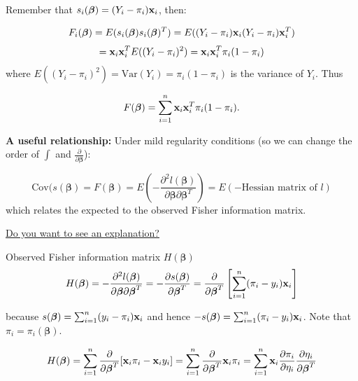 \documentclass[
  ignorenonframetext,
]{beamer}
\begin{document}
\begin{frame}
Remember that \(s_i(\boldsymbol{\beta})=(Y_i-\pi_i){\bf x}_i\), then:

\[ F_i(\boldsymbol{\beta}) = E(s_i(\boldsymbol{\beta})s_i(\boldsymbol{\beta})^T) = E((Y_i-\pi_i){\bf x}_i(Y_i-\pi_i){\bf x}_i^T) \]
\[= {\bf x}_i{\bf x}_i^T E((Y_i-\pi_i)^2) = {\bf x}_i{\bf x}_i^T \pi_i(1-\pi_i) \]
where \(E((Y_i-\pi_i)^2)=\text{Var}(Y_i)=\pi_i(1-\pi_i)\) is the
variance of \(Y_i\). Thus

\[F(\boldsymbol{\beta}) = \sum_{i=1}^n {\bf x}_i{\bf x}_i^T \pi_i(1-\pi_i).\]
\end{frame}

\begin{frame}
\textbf{A useful relationship:} Under mild regularity conditions (so we
can change the order of \(\int\) and
\(\frac{\partial}{\partial \boldsymbol{\beta}}\)):

\[\text{Cov}(s(\boldsymbol{\beta})=F(\boldsymbol{\beta}) = E\left( -\frac{\partial^2l(\boldsymbol{\beta})}{\partial\boldsymbol{\beta}\partial\boldsymbol{\beta}^T} \right) = E(-\text{Hessian matrix of }l)\]
which relates the expected to the observed Fisher information matrix.

\href{ExpectedFisherinfo.pdf}{Do you want to see an explanation?}
\end{frame}

\begin{frame}
\begin{block}{Observed Fisher information matrix
\(H(\boldsymbol{\beta})\)}
\protect\hypertarget{observed-fisher-information-matrix-hboldsymbolbeta}{}
\[H(\boldsymbol{\beta}) = -\frac{\partial^2l(\boldsymbol{\beta})}{\partial\boldsymbol{\beta}\partial\boldsymbol{\beta}^T} = -\frac{\partial s(\boldsymbol{\beta})}{\partial\boldsymbol{\beta}^T} = \frac{\partial}{\partial\boldsymbol{\beta}^T}\left[\sum_{i=1}^n (\pi_i-y_i){\bf x}_i \right] \]

because \(s(\boldsymbol{\beta}) = \sum_{i=1}^n (y_i-\pi_i){\bf x}_i\)
and hence
\(-s(\boldsymbol{\beta}) = \sum_{i=1}^n (\pi_i-y_i){\bf x}_i\). Note
that \(\pi_i = \pi_i(\boldsymbol{\beta})\).

\[H(\boldsymbol{\beta}) = \sum_{i=1}^n \frac{\partial}{\partial\boldsymbol{\beta}^T}[{\bf x}_i\pi_i-{\bf x}_iy_i] = \sum_{i=1}^n \frac{\partial}{\partial\boldsymbol{\beta}^T}{\bf x}_i\pi_i = \sum_{i=1}^n {\bf x}_i \frac{\partial \pi_i}{\partial \eta_i} \frac{\partial \eta_i}{\partial \boldsymbol{\beta}^T} \]
\end{block}
\end{frame}
\end{document}
